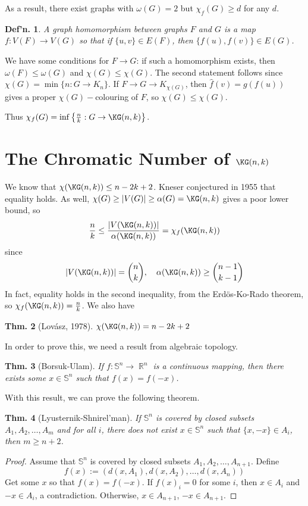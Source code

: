\documentclass[12pt, a4paper]{book}
\DeclareMathOperator{\R}{\mathbb{R}}
\newtheorem{theorem}{Thm.}[section]
\newtheorem{definition}[theorem]{Def'n.}
\theoremstyle{nonumberplain}
\newtheorem{proof}{Proof}
\begin{document}
As a result, there exist graphs with $\omega(G)=2$ but $\chi_f(G)\geq d$ for any $d$.
\begin{definition}
    A graph homomorphism between graphs $F$ and $G$ is a map $f:V(F)\to V(G)$ so that if $\{u,v\}\in E(F)$, then $\{f(u),f(v)\}\in E(G)$.
\end{definition}
We have some conditions for $F\to G$: if such a homomorphism exists, then $\omega(F)\leq\omega(G)$ and $\chi(G)\leq\chi(G)$.
The second statement follows since $\chi(G)=\min\{n:G\to K_n\}$.
If $F\to G\to K_{\chi(G)}$, then $\hat f(v)=g(f(u))$ gives a proper $\chi(G)-$colouring of $F$, so $\chi(G)\leq\chi(G)$.

Thus $\chi_f(G)=\inf\left\{\frac{n}{k}:G\to \KG(n,k)\right\}$.
\section{The Chromatic Number of $\KG(n,k)$}
We know that $\chi(\KG(n,k))\leq n-2k+2$.
Kneser conjectured in 1955 that equality holds.
As well, $\chi(G)\geq|V(G)|\geq\alpha(G)=\KG(n,k)$ gives a poor lower bound, so
\[\frac{n}{k}\leq \frac{|V(\KG(n,k))|}{\alpha(\KG(n,k))}=\chi_f(\KG(n,k))\]
since
\[|V(\KG(n,k))|=\binom{n}{k},\quad\alpha(\KG(n,k))\geq\binom{n-1}{k-1}\]
In fact, equality holds in the second inequality, from the Erd\"os-Ko-Rado theorem, so $\chi_f(\KG(n,k))=\frac{n}{k}$.
We also have
\begin{theorem}[Lov\'asz, 1978]
    $\chi(\KG(n,k))=n-2k+2$
\end{theorem}
In order to prove this, we need a result from algebraic topology.
\begin{theorem}[Borsuk-Ulam]
    If $f:\mathbb{S}^n\to\R^n$ is a continuous mapping, then there exists some $x\in\mathbb{S}^n$ such that $f(x)=f(-x)$.
\end{theorem}
With this result, we can prove the following theorem.
\begin{theorem}[Lyusternik-Shnirel'man]
    If $\mathbb{S}^n$ is covered by closed subsets $A_1,A_2,\ldots,A_m$ and for all $i$, there does not exist $x\in\mathbb{S}^n$ such that $\{x,-x\}\in A_i$, then $m\geq n+2$.
\end{theorem}
\begin{proof}
    Assume that $\mathbb{S}^n$ is covered by closed subsets $A_1,A_2,\ldots,A_{n+1}$.
    Define
    \[f(x):=(d(x,A_1),d(x,A_2),\ldots,d(x,A_n))\]
    Get some $x$ so that $f(x)=f(-x)$.
    If $f(x)_i=0$ for some $i$, then $x\in A_i$ and $-x\in A_i$, a contradiction.
    Otherwise, $x\in A_{n+1}$, $-x\in A_{n+1}$.
\end{proof}
\end{document}
